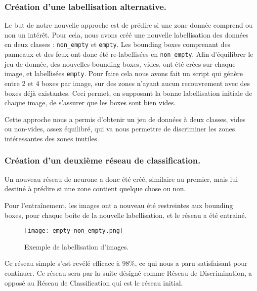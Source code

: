 \documentclass[twocolumn,10pt]{article}
\begin{document}
    \subsubsection{Création d'une labellisation alternative.}

    Le but de notre nouvelle approche est de prédire si une zone donnée comprend ou non un intérêt. Pour cela, nous avons créé une nouvelle labellisation des données en deux classes : \texttt{non\_empty} et \texttt{empty}. Les bounding boxes comprenant des panneaux et des feux ont donc été re-labellisées en \texttt{non\_empty}. Afin d'équilibrer le jeu de donnée, des nouvelles bounding boxes, vides, ont été crées sur chaque image, et labellisées \texttt{empty}. Pour faire cela nous avons fait un script qui génère entre 2 et 4 boxes par image, sur des zones n'ayant aucun recouvrement avec des boxes déjà existantes. Ceci permet, en supposant la bonne labellisation initiale de chaque image, de s'assurer que les boxes sont bien vides.

    Cette approche nous a permis d'obtenir un jeu de données à deux classes, vides ou non-vides, assez équilibré, qui va nous permettre de discriminer les zones intéressantes des zones inutiles.

    \subsubsection{Création d'un deuxième réseau de classification.}

    Un nouveau réseau de neurone a donc été créé, similaire au premier, mais lui destiné à prédire si une zone contient quelque chose ou non.

    Pour l'entraînement, les images ont a nouveau été restreintes aux bounding boxes, pour chaque boite de la nouvelle labellisation, et le réseau a été entrainé.

    \begin{figure}[H]
        \centering
        \texttt{[image: empty-non\_empty.png]}
        \caption{Exemple de labellisation d'images.}
        \label{fig:emptyornot}
    \end{figure}

    Ce réseau simple s'est revélé efficace à 98\%, ce qui nous a paru satisfaisant pour continuer. Ce réseau sera par la suite désigné comme Réseau de Discrimination, a opposé au Réseau de Classification qui est le réseau initial.
\end{document}
